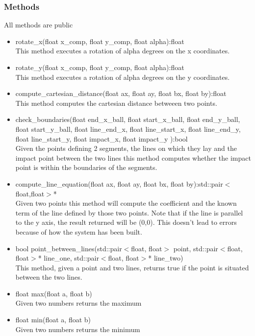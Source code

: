\documentclass[]{article}
\begin{document}
\subsubsection{Methods}
All methods are public
\begin{itemize}
	\item rotate\_x(float x\_comp, float y\_comp, float alpha):float \\This method executes a rotation of alpha degrees on the x coordinates.
	\item rotate\_y(float x\_comp, float y\_comp, float alpha):float\\This method executes a rotation of alpha degrees on the y coordinates.
	\item compute\_cartesian\_distance(float ax, float ay, float bx, float by):float\\This method computes the cartesian distance betweeen two points.
	\item check\_boundaries(float end\_x\_ball, float start\_x\_ball, float end\_y\_ball, float start\_y\_ball, float line\_end\_x, float line\_start\_x, float line\_end\_y, float line\_start\_y, float impact\_x, float impact\_y ):bool \\ Given the points defining 2 segments, the lines on which they lay and the impact point between the two lines this method computes whether the impact point is within the boundaries of the segments. 
	\item compute\_line\_equation(float ax, float ay, float bx, float by):std::pair$<$float,float$>$*\\Given two points this method will compute the coefficient and the known term of the line defined by those two points. Note that if the line is parallel to the y axis, the result returned will be (0,0). This doesn't lead to errors because of how the system has been built. 
	\item bool point\_between\_lines(std::pair$<$float, float$>$ point, std::pair$<$float, float$>$* line\_one, std::pair$<$float, float$>$* line\_two)\\This method, given a point and two lines, returns true if the point is situated between the two lines.
    \item float max(float a, float b)\\Given two numbers returns the maximum
    \item float min(float a, float b)\\Given two numbers returns the minimum
\end{itemize}
\newpage
\end{document}
